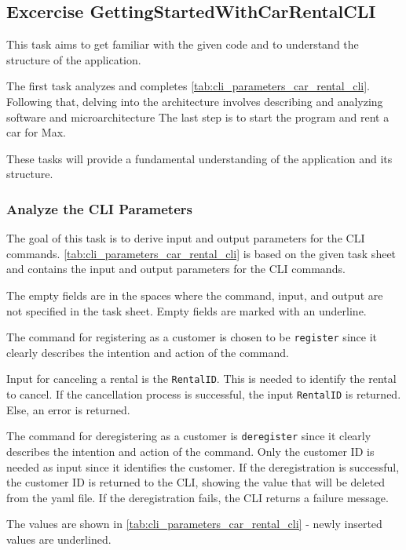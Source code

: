 \subsection{Excercise GettingStartedWithCarRentalCLI}
\label{sec:exercise_getting_started_with_car_rental_cli}
This task aims to get familiar with the given code and to understand the structure of the application.

The first task analyzes and completes \autoref{tab:cli_parameters_car_rental_cli}.
Following that, delving into the architecture involves describing and analyzing software and microarchitecture
The last step is to start the program and rent a car for Max.

These tasks will provide a fundamental understanding of the application and its structure.

\subsubsection*{Analyze the CLI Parameters}
The goal of this task is to derive input and output parameters for the CLI commands.
\autoref{tab:cli_parameters_car_rental_cli} is based on the given task sheet and contains the input and output parameters for the CLI commands.

The empty fields are in the spaces where the command, input, and output are not specified in the task sheet.
Empty fields are marked with an underline.

The command for registering as a customer is chosen to be \texttt{register} since it clearly describes the intention and action of the command.

Input for canceling a rental is the \texttt{RentalID}.
This is needed to identify the rental to cancel.
If the cancellation process is successful, the input \texttt{RentalID} is returned.
Else, an error is returned.

The command for deregistering as a customer is \texttt{deregister} since it clearly describes the intention and action of the command.
Only the customer ID is needed as input since it identifies the customer.
If the deregistration is successful, the customer ID is returned to the CLI, showing the value that will be deleted from the yaml file.
If the deregistration fails, the CLI returns a failure message.

The values are shown in \autoref{tab:cli_parameters_car_rental_cli} - newly inserted values are underlined.

